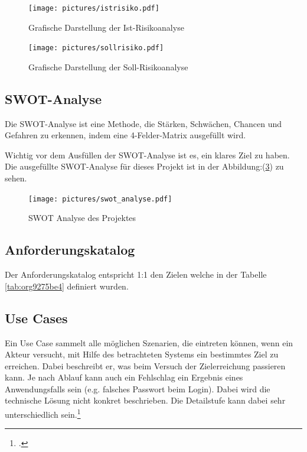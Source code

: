 \begin{figure}[H]
\centering
\texttt{[image: pictures/istrisiko.pdf]}
\caption{\label{fig:org85added}
Grafische Darstellung der Ist-Risikoanalyse}
\end{figure}

\begin{figure}[H]
\centering
\texttt{[image: pictures/sollrisiko.pdf]}
\caption{\label{fig:org5e0b50f}
Grafische Darstellung der Soll-Risikoanalyse}
\end{figure}

\newpage
\subsection{SWOT-Analyse}
\label{sec:orgd45af75}

Die SWOT-Analyse ist eine Methode, die Stärken, Schwächen, Chancen und
Gefahren zu erkennen, indem eine 4-Felder-Matrix ausgefüllt wird.

Wichtig vor dem Ausfüllen der SWOT-Analyse ist es, ein klares Ziel zu
haben. Die ausgefüllte SWOT-Analyse für dieses Projekt ist in der
Abbildung:(\ref{fig:org5fafa63}) zu sehen.

\begin{figure}[htbp]
\centering
\texttt{[image: pictures/swot\_analyse.pdf]}
\caption{\label{fig:org5fafa63}
SWOT Analyse des Projektes}
\end{figure}

\subsection{Anforderungskatalog}
\label{sec:org82903aa}

Der Anforderungskatalog entspricht 1:1 den Zielen welche in der Tabelle
\ref{tab:org9275be4} definiert wurden.

\subsection{Use Cases}
\label{sec:orgc44612b}

Ein Use Case sammelt alle möglichen Szenarien, die eintreten können,
wenn ein Akteur versucht, mit Hilfe des betrachteten Systems ein
bestimmtes Ziel zu erreichen. Dabei beschreibt er, was beim Versuch der
Zielerreichung passieren kann. Je nach Ablauf kann auch ein Fehlschlag
ein Ergebnis eines Anwendungsfalls sein (e.g. falsches Passwort beim
Login). Dabei wird die technische Lösung nicht konkret beschrieben.
Die Detailstufe kann dabei sehr unterschiedlich sein.\footcite{usecase}

